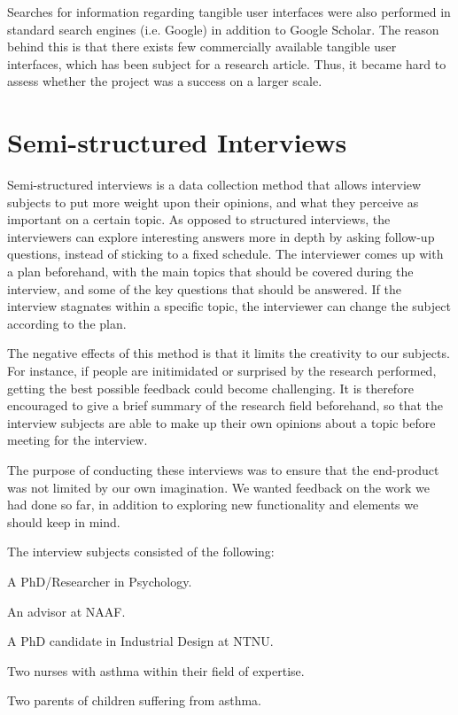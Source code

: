Searches for information regarding tangible user interfaces were also performed in standard search engines (i.e. Google) in addition to Google Scholar. The reason behind this is that there exists few commercially available tangible user interfaces, which has been subject for a research article. Thus, it became hard to assess whether the project was a success on a larger scale. 
 
\section{Semi-structured Interviews}
\label{sec:semistructuredinterviews}

Semi-structured interviews is a data collection method that allows interview subjects to put more weight upon their opinions, and what they perceive as important on a certain topic. As opposed to structured interviews, the interviewers can explore interesting answers more in depth by asking follow-up questions, instead of sticking to a fixed schedule. The interviewer comes up with a plan beforehand, with the main topics that should be covered during the interview, and some of the key questions that should be answered. If the interview stagnates within a specific topic, the interviewer can change the subject according to the plan.

The negative effects of this method is that it limits the creativity to our subjects. For instance, if people are initimidated or surprised by the research performed, getting the best possible feedback could become challenging. It is therefore encouraged to give a brief summary of the research field beforehand, so that the interview subjects are able to make up their own opinions about a topic before meeting for the interview\cite{harrell2009data}.

The purpose of conducting these interviews was to ensure that the end-product was not limited by our own imagination. We wanted feedback on the work we had done so far, in addition to exploring new functionality and elements we should keep in mind.

The interview subjects consisted of the following: 

A PhD/Researcher in Psychology.

An advisor at NAAF.

A PhD candidate in Industrial Design at NTNU. 

Two nurses with asthma within their field of expertise.

Two parents of children suffering from asthma.    



